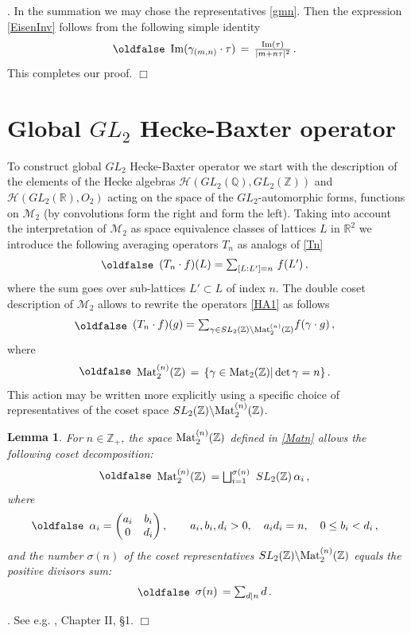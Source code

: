 \documentclass[12pt]{article}
\def\IQ{\mathbb{Q}}
\def\IR{\mathbb{R}}
\def\IZ{\mathbb{Z}}
\def\CH {\mathcal{H}}
\def\CM {\mathcal{M}}
\def\s {{\sigma}}
\def\Mat{{\rm Mat}}
\newtheorem{lem}{Lemma}[section]
\newcommand{\proof}{\noindent {\it Proof}. }
\def\be{\begin{eqnarray}\new\begin{array}{cc}}
\def\ee{\end{array}\end{eqnarray}}
\newcounter{pac}[section]
\begin{document}
\proof In the summation we may chose the representatives
\eqref{gmn}. Then the expression \eqref{EisenInv} follows from  the
following simple identity
 \be
  {\rm Im}(\gamma_{(m,n)}\cdot \tau)\,
  =\,\frac{{\rm Im}(\tau)}{|m+n\tau|^2}\,.
 \ee
This completes our proof. $\Box$



\section{ Global $GL_2$ Hecke-Baxter operator}

To construct global $GL_2$ Hecke-Baxter operator we start with the
description of the elements of the Hecke  algebras
$\CH(GL_2(\IQ),GL_2(\IZ))$  and $\CH(GL_2(\IR),O_2)$ acting on the
space of the $GL_2$-automorphic forms, functions on $\CM_2$ (by
convolutions form the right and form the left).  Taking into account
the interpretation of  $\CM_2$ as space equivalence classes of
lattices $L$ in $\IR^2$ we introduce the following  averaging
operators $T_n$ as analogs of \eqref{Tn}
 \be\label{HA1}
  (T_n\cdot f)(L)=\sum_{[L:L']=n}\,f(L')\,,
 \ee
where the sum goes over sub-lattices $L'\subset L$ of index $n$.
The double coset description of $\CM_2$ allows to rewrite
the operators \eqref{HA1} as follows
 \be\label{HA2}
  (T_n\cdot f)(g)=\sum_{\gamma\in {SL_2(\IZ)\backslash\Mat}^{(n)}_2(\IZ)}\!
  f(\gamma\cdot g)\,,
 \ee
where
 \be\label{Matn}
  \Mat^{(n)}_2(\IZ)\,
  =\,\{\gamma\in {\rm Mat}_2(\IZ)|\det \gamma=n\}\,.
 \ee
This action may be written more explicitly using a specific choice of
representatives of the coset space
$SL_2(\IZ)\backslash\Mat^{(n)}_2(\IZ)$.

\begin{lem} For $n\in\IZ_+$, the space $\Mat^{(n)}_2(\IZ)$ defined in \eqref{Matn} allows the following coset decomposition:
 \be\label{Coset1}
  \Mat^{(n)}_2(\IZ)\,
  =\bigsqcup_{i=1}^{\s(n)}\,\,SL_2(\IZ)\,\alpha_i\,,
 \ee
where
 \be\label{Cosetrep}
  \alpha_i=\begin{pmatrix} a_i& b_i \\0 & d_i\end{pmatrix}, \qquad
  a_i,b_i,d_i>0,\quad a_id_i=n, \quad 0\leq b_i<d_i\,,
\ee
and the number $\s(n)$ of the coset representatives
$SL_2(\IZ)\backslash\Mat^{(n)}_2(\IZ)$ equals the positive divisors sum:
 \be
  \s(n)\,=\sum_{d|n}d\,.
 \ee
\end{lem}
\proof See e.g. \cite{L}, Chapter II, \S1. $\Box$
\end{document}
